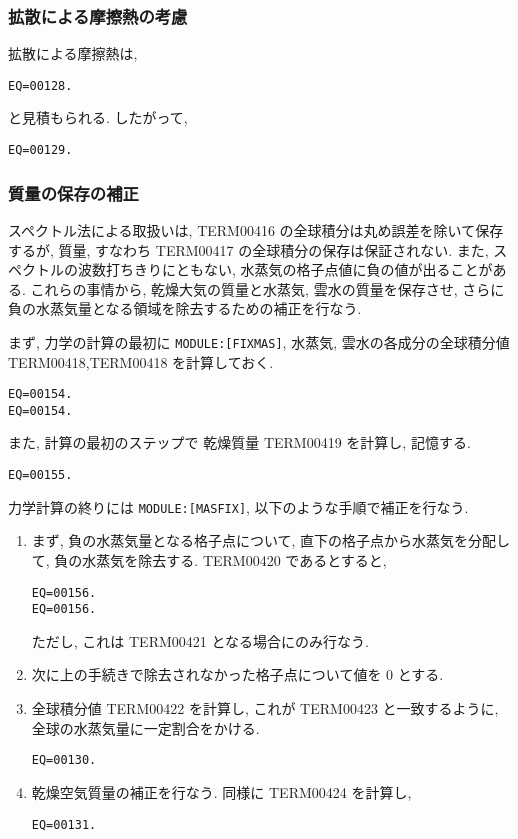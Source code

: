 \subsubsection{拡散による摩擦熱の考慮}

拡散による摩擦熱は,
\begin{verbatim}
EQ=00128.
\end{verbatim}
と見積もられる.
したがって,
\begin{verbatim}
EQ=00129.
\end{verbatim}

\subsubsection{質量の保存の補正}

スペクトル法による取扱いは,
TERM00416 の全球積分は丸め誤差を除いて保存するが,
質量, すなわち TERM00417 の全球積分の保存は保証されない.
また, スペクトルの波数打ちきりにともない,
水蒸気の格子点値に負の値が出ることがある.
これらの事情から, 
乾燥大気の質量と水蒸気, 雲水の質量を保存させ,
さらに負の水蒸気量となる領域を除去するための補正を行なう.

まず, 力学の計算の最初に \texttt{MODULE:[FIXMAS]},
水蒸気, 雲水の各成分の全球積分値 TERM00418,TERM00418 を計算しておく.
\begin{verbatim}
EQ=00154.
EQ=00154.
\end{verbatim}
また, 計算の最初のステップで
乾燥質量 TERM00419 を計算し, 記憶する.
\begin{verbatim}
EQ=00155.
\end{verbatim}

力学計算の終りには \texttt{MODULE:[MASFIX]},
以下のような手順で補正を行なう.
\begin{enumerate}
\item まず, 負の水蒸気量となる格子点について,
      直下の格子点から水蒸気を分配して,
      負の水蒸気を除去する.
      TERM00420 であるとすると,
      \begin{verbatim}
EQ=00156.
EQ=00156.
\end{verbatim}
      ただし, これは TERM00421 となる場合にのみ行なう.

\item 次に上の手続きで除去されなかった格子点について値を 0 とする.

\item 全球積分値 TERM00422 を計算し,
      これが TERM00423 と一致するように,
      全球の水蒸気量に一定割合をかける.

      \begin{verbatim}
EQ=00130.
\end{verbatim}
      
\item 乾燥空気質量の補正を行なう.
      同様に TERM00424 を計算し,

      \begin{verbatim}
EQ=00131.
\end{verbatim}

\end{enumerate}

